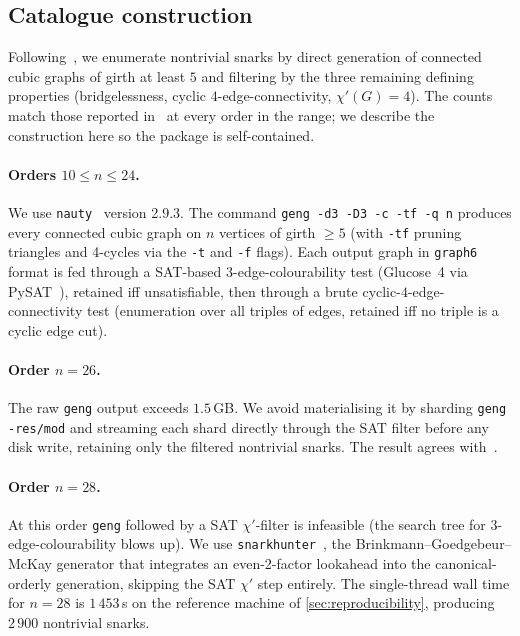 \subsection{Catalogue construction}
\label{sec:finite-theorem-catalogue}

Following~\cite{BGHM13}, we enumerate nontrivial snarks by direct
generation of connected cubic graphs of girth at least $5$ and
filtering by the three remaining defining properties (bridgelessness,
cyclic $4$-edge-connectivity, $\chi'(G) = 4$). The counts match those
reported in~\cite{BGHM13} at every order in the range; we describe
the construction here so the package is self-contained.

\paragraph{Orders $10 \le n \le 24$.}
We use \texttt{nauty}~\cite{nauty} version 2.9.3. The command
\verb|geng -d3 -D3 -c -tf -q n| produces every connected cubic graph
on $n$ vertices of girth $\ge 5$ (with \verb|-tf| pruning triangles
and 4-cycles via the \verb|-t| and \verb|-f| flags). Each output graph
in \texttt{graph6} format is fed through a SAT-based 3-edge-colourability
test (Glucose~4 via PySAT~\cite{python_sat}), retained iff
unsatisfiable, then through a brute cyclic-$4$-edge-connectivity test
(enumeration over all triples of edges, retained iff no triple is a
cyclic edge cut).

\paragraph{Order $n = 26$.}
The raw \texttt{geng} output exceeds $1.5$\,GB. We avoid materialising
it by sharding \verb|geng -res/mod| and streaming each shard directly
through the SAT filter before any disk write, retaining only the
filtered nontrivial snarks. The result agrees with~\cite{BGHM13}.

\paragraph{Order $n = 28$.}
At this order \texttt{geng} followed by a SAT $\chi'$-filter is
infeasible (the search tree for 3-edge-colourability blows up). We
use \texttt{snarkhunter}~\cite{snarkhunter}, the
Brinkmann--Goedgebeur--McKay generator that integrates an even-2-factor
lookahead into the canonical-orderly generation, skipping the SAT
$\chi'$ step entirely. The single-thread wall time for $n = 28$ is
$1\,453$\,s on the reference machine of
\cref{sec:reproducibility}, producing $2\,900$ nontrivial snarks.

